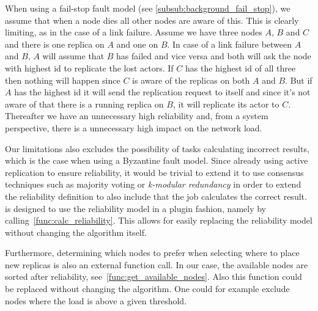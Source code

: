 \documentclass{cslthse-msc}
\begin{document}

When using a fail-stop fault model (see \cref{subsub:background_fail_stop}), we assume that when a node dies all other nodes are aware of this. This is clearly limiting, as in the case of a link failure. Assume we have three nodes $A$, $B$ and $C$ and there is one replica on $A$ and one on $B$. In case of a link failure between $A$ and $B$, $A$ will assume that $B$ has failed and vice versa and both will ask the node with highest id to replicate the lost actors. If $C$ has the highest id of all three then nothing will happen since $C$ is aware of the replicas on both $A$ and $B$. But if $A$ has the highest id it will send the replication request to itself and since it's not aware of that there is a running replica on $B$, it will replicate its actor to $C$. Thereafter we have an unnecessary high reliability and, from a system perspective, there is a unnecessary high impact on the network load.

Our limitations also excludes the possibility of tasks calculating incorrect results, which is the case when using a Byzantine fault model. Since already using active replication to ensure reliability, it would be trivial to extend it to use consensus techniques such as majority voting or \emph{k-modular redundancy} in order to extend the reliability definition to also include that the job calculates the correct result.
\\

 is designed to use the reliability model in a plugin fashion, namely by calling~\cref{func:calc_reliability}. This allows for easily replacing the reliability model without changing the algorithm itself.

Furthermore, determining which nodes to prefer when selecting where to place new replicas is also an external function call. In our case, the available nodes are sorted after reliability, see~\cref{func:get_available_nodes}. Also this function could be replaced without changing the algorithm. One could for example exclude nodes where the load is above a given threshold.
\end{document}
